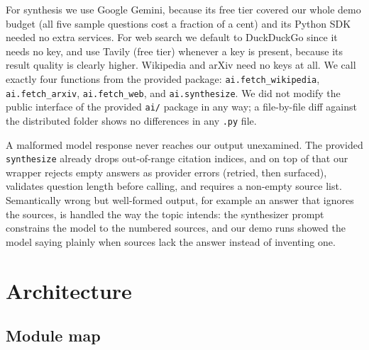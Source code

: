 \documentclass[11pt,a4paper]{article}
\begin{document}
For synthesis we use Google Gemini, because its free tier covered our whole demo budget (all five sample questions cost a fraction of a cent) and its Python SDK needed no extra services. For web search we default to DuckDuckGo since it needs no key, and use Tavily (free tier) whenever a key is present, because its result quality is clearly higher. Wikipedia and arXiv need no keys at all. We call exactly four functions from the provided package: \texttt{ai.fetch\_wikipedia}, \texttt{ai.fetch\_arxiv}, \texttt{ai.fetch\_web}, and \texttt{ai.synthesize}. We did not modify the public interface of the provided \texttt{ai/} package in any way; a file-by-file diff against the distributed folder shows no differences in any \texttt{.py} file.

A malformed model response never reaches our output unexamined. The provided \texttt{synthesize} already drops out-of-range citation indices, and on top of that our wrapper rejects empty answers as provider errors (retried, then surfaced), validates question length before calling, and requires a non-empty source list. Semantically wrong but well-formed output, for example an answer that ignores the sources, is handled the way the topic intends: the synthesizer prompt constrains the model to the numbered sources, and our demo runs showed the model saying plainly when sources lack the answer instead of inventing one.

\section{Architecture}\label{sec:arch}

\subsection{Module map}
\end{document}
